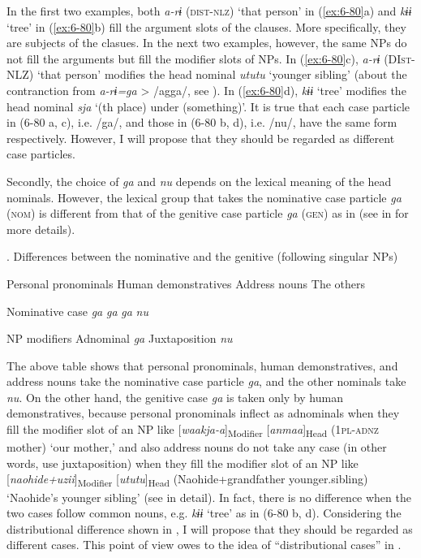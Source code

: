\begin{table}
In the first two examples, both \textit{a-rɨ} (\textsc{dist}-\textsc{nlz}) ‘that person’ in (\ref{ex:6-80}a) and \textit{kɨɨ} ‘tree’ in (\ref{ex:6-80}b) fill the argument slots of the clauses. More specifically, they are subjects of the clasues. In the next two examples, however, the same NPs do not fill the arguments but fill the modifier slots of NPs. In (\ref{ex:6-80}c), \textit{a-rɨ} (DI\textsc{st}-NLZ) ‘that person’ modifies the head nominal \textit{ututu} ‘younger sibling’ (about the contranction from \textit{a-rɨ=ga} > /agga/, see ). In (\ref{ex:6-80}d), \textit{kɨɨ} ‘tree’ modifies the head nominal \textit{sja} ‘(th place) under (something)’. It is true that each case particle in (6-80 a, c), i.e. /ga/, and those in (6-80 b, d), i.e. /nu/, have the same form respectively. However, I will propose that they should be regarded as different case particles.

Secondly, the choice of \textit{ga} and \textit{nu} depends on the lexical meaning of the head nominals. However, the lexical group that takes the nominative case particle \textit{ga} (\textsc{nom}) is different from that of the genitive case particle \textit{ga} (\textsc{gen}) as in  (see  in  for more details).

\caption{\label{tab:key:41}. Differences between the nominative and the genitive (following singular NPs)}


  Personal pronominals  Human demonstratives  Address nouns  The others

Nominative case  \textit{ga}  \textit{ga}  \textit{ga}  \textit{nu}

NP modifiers  Adnominal  \textit{ga}  Juxtaposition  \textit{nu}

The above table shows that personal pronominals, human demonstratives, and address nouns take the nominative case particle \textit{ga}, and the other nominals take \textit{nu}. On the other hand, the genitive case \textit{ga} is taken only by human demonstratives, because personal pronominals inflect as adnominals when they fill the modifier slot of an NP like [\textit{waakja-a}]\textsubscript{Modifier} [\textit{anmaa}]\textsubscript{Head} (1\textsc{pl}-\textsc{adnz} mother) ‘our mother,’ and also address nouns do not take any case (in other words, use juxtaposition) when they fill the modifier slot of an NP like [\textit{naohide+uzii}]\textsubscript{Modifier} [\textit{ututu}]\textsubscript{Head} (Naohide+grandfather younger.sibling) ‘Naohide’s younger sibling’ (see  in detail). In fact, there is no difference when the two cases follow common nouns, e.g. \textit{kɨɨ} ‘tree’ as in (6-80 b, d). Considering the distributional difference shown in , I will propose that they should be regarded as different cases. This point of view owes to the idea of “distributional cases” in \citet{Comrie1991}.


\end{table}
